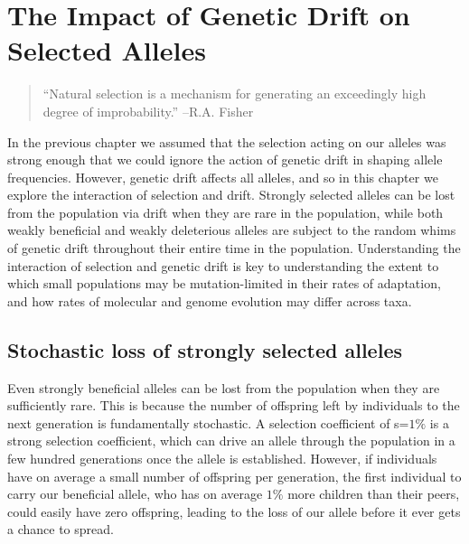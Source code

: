 \chapter{The Impact of Genetic Drift on Selected Alleles}
\label{Selection_Stochasticity}

\begin{quote}
 ``Natural selection is a mechanism for generating an exceedingly high
 degree of improbability.” --R.A. Fisher
\end{quote}



In the previous chapter we assumed that the selection acting on our
alleles was strong enough that we could ignore the action of genetic
drift in shaping allele frequencies. However, genetic drift affects all
alleles, and so in this chapter we explore the interaction of
selection and drift. Strongly selected alleles can be
lost from the population via drift when they are rare in the population, while both weakly
beneficial and weakly deleterious alleles are subject to the random
whims of genetic drift throughout their entire time in the
population. Understanding the interaction of selection and genetic
drift is key to understanding the extent to which small populations
may be mutation-limited in their rates of adaptation, and how rates of
molecular and genome evolution may differ across taxa.

\section{Stochastic loss of strongly selected alleles}

Even strongly beneficial alleles can be lost from the population when
they are sufficiently rare. This is because the number of offspring
left by individuals to the next generation is fundamentally
stochastic. A selection coefficient of s=$1\%$ is a strong
selection coefficient, which can drive an allele through the
population in a few hundred generations once the allele is
established. However, if individuals have on average a small number of
offspring per generation, the first individual to carry our beneficial allele, who
has on average $1\%$ more children than their peers, could easily have zero offspring, leading to the loss
of our allele before it ever gets a chance to spread.\\

